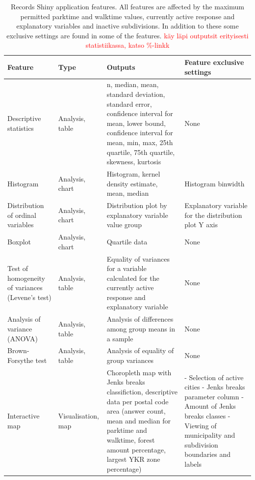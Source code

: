 \begin{table}[H]
    \centering
    \caption[Records Shiny application features]{Records Shiny application features. All features are affected by the maximum permitted parktime and walktime values, currently active response and explanatory variables and inactive subdivisions. In addition to these some exclusive settings are found in some of the features. \textcolor{red}{käy läpi outputsit erityisesti statistiikassa, katso \%-linkk}} 
    \label{tab:records_shiny_features}
    \scalebox{0.8}
    {\def\arraystretch{1.3}
    \setlength\tabcolsep{1.2ex}
    \begin{tabular}{ @{} >{\raggedright\arraybackslash}p{3cm} >{\raggedright\arraybackslash}p{2cm} >{\raggedright\arraybackslash}p{6cm} >{\raggedright\arraybackslash}p{6cm} @{} }
        \toprule
        Feature & Type & Outputs & Feature exclusive settings \\
        \midrule
        1 Descriptive statistics & Analysis, table & n, median, mean, standard deviation, standard error, confidence interval for mean, lower bound, confidence interval for mean, min, max, 25th quartile, 75th quartile, skewness, kurtosis & None \\
        2 Histogram & Analysis, chart & Histogram, kernel density estimate, mean, median & Histogram binwidth \\
        3 Distribution of ordinal variables & Analysis, chart & Distribution plot by explanatory variable value group & Explanatory variable for the distribution plot Y axis \\
        4 Boxplot & Analysis, chart & Quartile data & None \\
        5 Test of homogeneity of variances (Levene's test) & Analysis, table & Equality of variances for a variable calculated for the currently active response and explanatory variable & None \\
        6 Analysis of variance (ANOVA) & Analysis, table & Analysis of differences among group means in a sample & None \\
        7 Brown-Forsythe test & Analysis, table & Analysis of equality of group variances & None \\
        8 Interactive map & Visualisation, map & Choropleth map with Jenks breaks classifiction, descriptive data per postal code area (answer count, mean and median for parktime and walktime, forest amount percentage, largest YKR zone percentage) & - Selection of active cities \linebreak - Jenks breaks parameter column \linebreak - Amount of Jenks breaks classes \linebreak - Viewing of municipality and subdivision boundaries and labels \\
        \bottomrule
    \end{tabular}}
\end{table} 

